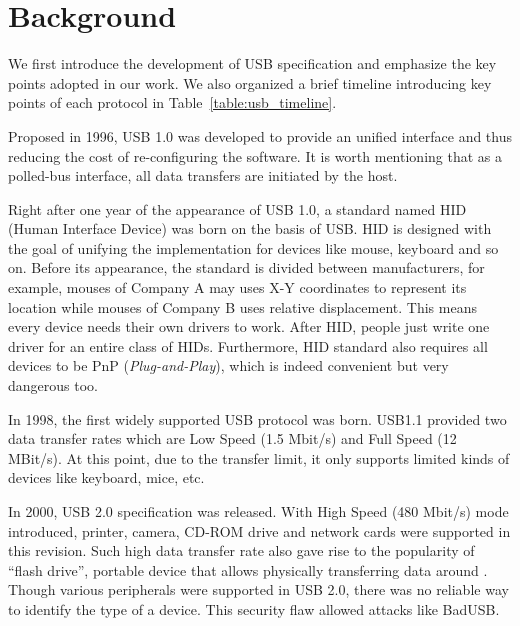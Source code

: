 \section{Background}
\label{sec:background}
We first introduce the development of USB specification and emphasize the key points adopted in our work. We also organized a brief timeline introducing key points of each protocol in Table~\ref{table:usb_timeline}.

Proposed in 1996, USB 1.0\cite{usb10} was developed to provide an unified interface and thus reducing the cost of re-configuring the software. It is worth mentioning that as a polled-bus interface, all data transfers are initiated by the host.

Right after one year of the appearance of USB 1.0, a standard named HID (Human Interface Device) was born on the basis of USB. HID is designed with the goal of unifying the implementation for devices like mouse, keyboard and so on. Before its appearance, the standard is divided between manufacturers, for example, mouses of Company A may uses X-Y coordinates to represent its location while mouses of Company B uses relative displacement. This means every device needs their own drivers to work. After HID, people just write one driver for an entire class of HIDs. Furthermore, HID standard also requires all devices to be PnP (\emph{Plug-and-Play}), which is indeed convenient but very dangerous too. 

In 1998, the first widely supported USB protocol was born. USB1.1\cite{usb11} provided two data transfer rates which are Low Speed (1.5 Mbit/s) and Full Speed (12 MBit/s). At this point, due to the transfer limit, it only supports limited kinds of devices like keyboard, mice, etc.

In 2000, USB 2.0\cite{usb20} specification was released. With High Speed (480 Mbit/s) mode introduced, printer, camera, CD-ROM drive and network cards were supported in this revision. Such high data transfer rate also gave rise to the popularity of ``flash drive'', portable device that allows physically transferring data around \cite{sok}. Though various peripherals were supported in USB 2.0, there was no reliable way to identify the type of a device. This security flaw allowed attacks like BadUSB\cite{rubber}.

